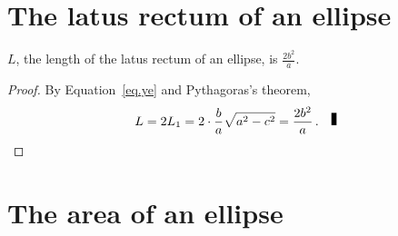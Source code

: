 %
%
%
%
%
%


\section{The latus rectum of an ellipse}

\begin{theorem}\label{thm.ellipse-lr}
$L$, the length of the latus rectum of an ellipse, is 
$\displaystyle\frac{2b^2}{a}$.
\end{theorem}
\begin{proof}
By Equation~\ref{eq.ye} and Pythagoras's theorem,
\[
L=2L_1=2\cdot\frac{b}{a}\sqrt{a^2-c^2}=\displaystyle\frac{2b^2}{a}\,.\fqed
\]
\end{proof}


\section{The area of an ellipse}

